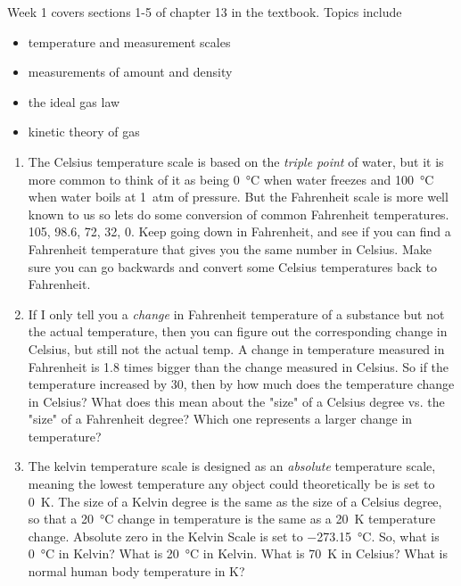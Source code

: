 Week 1 covers sections 1-5 of chapter 13 in the textbook. Topics include
\begin{itemize}
	\item temperature and measurement scales
	\item measurements of amount and density
	\item the ideal gas law
	\item kinetic theory of gas 
\end{itemize}


\begin{enumerate}
\setlength\itemsep{2 in}

\item
The Celsius temperature scale is based on the \emph{triple point} of water, but it is more common to think of it as being \SI{0}{\celsius} when water freezes and \SI{100}{\celsius} when water boils at \SI{1}{atm} of pressure. But the Fahrenheit scale is more well known to us so lets do some conversion of common Fahrenheit temperatures. \SI{105}{\fahrenheit}, \SI{98.6}{\fahrenheit}, \SI{72}{\fahrenheit}, \SI{32}{\fahrenheit}, \SI{0}{\fahrenheit}. Keep going down in Fahrenheit, and see if you can find a Fahrenheit temperature that gives you  the same number in Celsius. Make sure you can go backwards and convert some Celsius temperatures back to Fahrenheit.

\item
If I only tell you a \emph{change} in Fahrenheit temperature of a substance but not the actual temperature, then you can figure out the corresponding change in Celsius, but still not the actual temp. A change in temperature measured in Fahrenheit is 1.8 times bigger than the change measured in Celsius. So if the temperature increased by \SI{30}{\fahrenheit}, then by how much does the temperature change in Celsius? What does this mean about the "size" of a Celsius degree vs. the "size" of a Fahrenheit degree? Which one represents a larger change in temperature?

\item
The kelvin temperature scale is designed as an \emph{absolute} temperature scale, meaning the lowest temperature any object could theoretically be is set to \SI{0}{\kelvin}. The size of a Kelvin degree is the same as the size of a Celsius degree, so that a \SI{20}{\celsius} change in temperature is the same as a \SI{20}{\kelvin} temperature change. Absolute zero in the Kelvin Scale is set to \SI{-273.15}{\celsius}. So, what is \SI{0}{\celsius} in Kelvin? What is \SI{20}{\celsius} in Kelvin. What is \SI{70}{\kelvin} in Celsius? What is normal human body temperature in K?


\end{enumerate}
